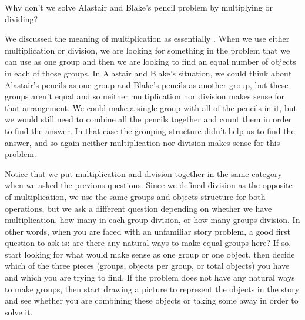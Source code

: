 \documentclass{ximera}
\begin{document}
\begin{question}
Why don't we solve Alastair and Blake's pencil problem by multiplying or dividing?

\begin{explanation}
We discussed the meaning of multiplication as essentially . When we use either multiplication or division, we are looking for something in the problem that we can use as one group and then we are looking to find an equal number of objects in each of those groups. In Alastair and Blake's situation, we could think about Alastair's pencils as one group and Blake's pencils as another group, but these groups aren't equal and so neither multiplication nor division makes sense for that arrangement. We could make a single group with all of the pencils in it, but we would still need to combine all the pencils together and count them in order to find the answer. In that case the grouping structure didn't help us to find the answer, and so again neither multiplication nor division makes sense for this problem.
\end{explanation}
\end{question}

Notice that we put multiplication and division together in the same category when we asked the previous questions. Since we defined division as the opposite of multiplication, we use the same groups and objects structure for both operations, but we ask a different question depending on whether we have multiplication, how many in each group division, or how many groups division. In other words, when you are faced with an unfamiliar story problem, a good first question to ask is: are there any natural ways to make equal groups here? If so, start looking for what would make sense as one group or one object, then decide which of the three pieces (groups, objects per group, or total objects) you have and which you are trying to find. If the problem does not have any natural ways to make groups, then start drawing a picture to represent the objects in the story and see whether you are combining these objects or taking some away in order to solve it.
\end{document}
